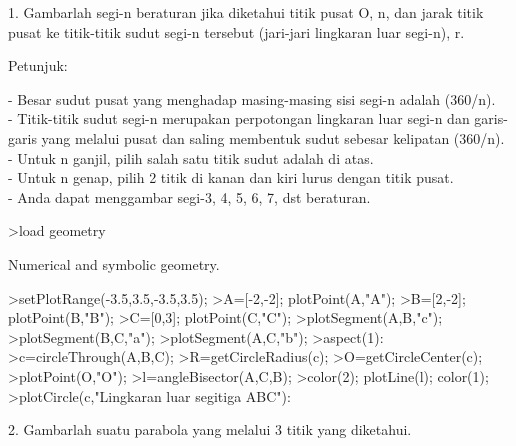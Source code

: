 \documentclass[a4paper,10pt]{article}
\begin{document}
\begin{eulernotebook}
\begin{eulercomment}
\begin{eulercomment}
\begin{eulercomment}
\begin{eulercomment}
\begin{eulercomment}
\begin{eulercomment}
\begin{eulercomment}
\begin{eulercomment}
\begin{eulercomment}
\begin{eulercomment}
\begin{eulercomment}
\begin{eulercomment}
\begin{eulercomment}
\begin{eulercomment}
\begin{eulercomment}
\begin{eulercomment}
\begin{eulercomment}
\begin{eulercomment}
\begin{eulercomment}
\begin{eulercomment}
\begin{eulercomment}
\begin{eulercomment}
\begin{eulercomment}
\begin{eulercomment}
\begin{eulercomment}
\begin{eulercomment}
\begin{eulercomment}
\begin{eulercomment}
\begin{eulercomment}
\begin{eulercomment}
\begin{eulerprompt}
\end{eulerprompt}
\begin{eulercomment}
1. Gambarlah segi-n beraturan jika diketahui titik pusat O, n, dan
jarak titik pusat ke titik-titik sudut segi-n tersebut (jari-jari
lingkaran luar segi-n), r.

Petunjuk:

- Besar sudut pusat yang menghadap masing-masing sisi segi-n adalah
(360/n).\\
- Titik-titik sudut segi-n merupakan perpotongan lingkaran luar segi-n
dan garis-garis yang melalui pusat dan saling membentuk sudut sebesar
kelipatan (360/n).\\
- Untuk n ganjil, pilih salah satu titik sudut adalah di atas.\\
- Untuk n genap, pilih 2 titik di kanan dan kiri lurus dengan titik
pusat.\\
- Anda dapat menggambar segi-3, 4, 5, 6, 7, dst beraturan.
\end{eulercomment}
\begin{eulerprompt}
>load geometry
\end{eulerprompt}
\begin{euleroutput}
  Numerical and symbolic geometry.
\end{euleroutput}
\begin{eulerprompt}
>setPlotRange(-3.5,3.5,-3.5,3.5);
>A=[-2,-2]; plotPoint(A,"A");
>B=[2,-2]; plotPoint(B,"B");
>C=[0,3]; plotPoint(C,"C");
>plotSegment(A,B,"c");
>plotSegment(B,C,"a");
>plotSegment(A,C,"b");
>aspect(1):
>c=circleThrough(A,B,C);
>R=getCircleRadius(c);
>O=getCircleCenter(c);
>plotPoint(O,"O");
>l=angleBisector(A,C,B);
>color(2); plotLine(l); color(1);
>plotCircle(c,"Lingkaran luar segitiga ABC"):
\end{eulerprompt}
\begin{eulercomment}
2. Gambarlah suatu parabola yang melalui 3 titik yang diketahui.


\end{eulercomment}
\end{eulercomment}
\end{eulercomment}
\end{eulercomment}
\end{eulercomment}
\end{eulercomment}
\end{eulercomment}
\end{eulercomment}
\end{eulercomment}
\end{eulercomment}
\end{eulercomment}
\end{eulercomment}
\end{eulercomment}
\end{eulercomment}
\end{eulercomment}
\end{eulercomment}
\end{eulercomment}
\end{eulercomment}
\end{eulercomment}
\end{eulercomment}
\end{eulercomment}
\end{eulercomment}
\end{eulercomment}
\end{eulercomment}
\end{eulercomment}
\end{eulercomment}
\end{eulercomment}
\end{eulercomment}
\end{eulercomment}
\end{eulercomment}
\end{eulercomment}
\end{eulernotebook}
\end{document}

